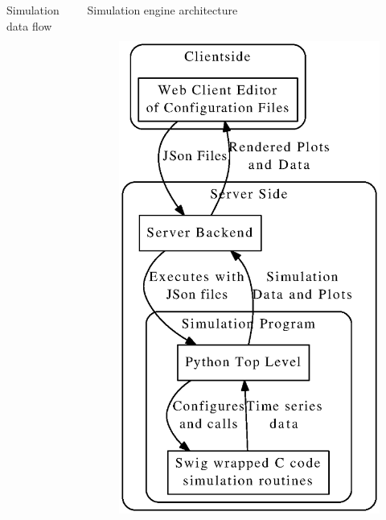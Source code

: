 \documentclass[final]{beamer}
\begin{document}
\begin{frame}{}
\begin{columns}[t]
\begin{column}{.47\textwidth}
\begin{block}{Simulation data flow}
        \end{block}
      \end{column}
      \begin{column}{.47\textwidth}
        \begin{block}{Simulation engine architecture}
	    \begin{column}{0.35\textwidth}
	      \begin{figure}
		\centering
		\includegraphics[width=\textwidth]{architecture.eps}

\end{figure}
\end{column}
\end{block}
\end{column}
\end{columns}
\end{frame}
\end{document}
